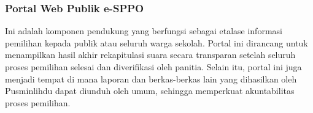 \subsubsection{Portal Web Publik e-SPPO}
Ini adalah komponen pendukung yang berfungsi sebagai etalase informasi pemilihan kepada publik atau seluruh warga sekolah. Portal ini dirancang untuk menampilkan hasil akhir rekapitulasi suara secara transparan setelah seluruh proses pemilihan selesai dan diverifikasi oleh panitia. Selain itu, portal ini juga menjadi tempat di mana laporan dan berkas-berkas lain yang dihasilkan oleh Pusminlihdu dapat diunduh oleh umum, sehingga memperkuat akuntabilitas proses pemilihan.

